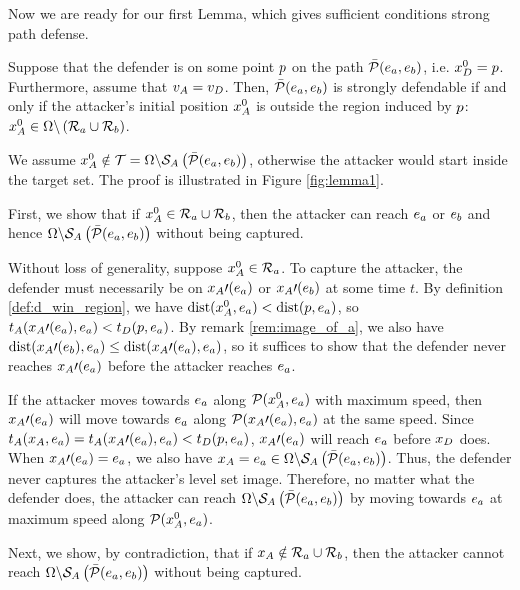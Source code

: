 Now we are ready for our first Lemma, which gives sufficient conditions strong path defense.
\begin{lem}
\label{lem:d_winning_region}
Suppose that the defender is on some point $p$ on the path $\bar{\mathcal{P}}(e_a,e_b)$, i.e. $x_D^0 = p$. Furthermore, assume that $v_A=v_D$. Then, $\bar{\mathcal{P}}(e_a,e_b)$ is strongly defendable if and only if the attacker's initial position $x_A^0$ is outside the region induced by $p$: $x_A^0\in\Omega\backslash\left(\mathcal{R}_a \cup \mathcal{R}_b\right)$.
\end{lem}

\begin{IEEEproof} %
We assume $x_A^0 \notin \mathcal{T} = \Omega\backslash\mathcal{S}_A\left(\bar{\mathcal{P}}(e_a,e_b)\right)$, otherwise the attacker would start inside the target set. The proof is illustrated in Figure \ref{fig:lemma1}.

First, we show that if $x_A^0\in \mathcal{R}_a \cup \mathcal{R}_b$, then the attacker can reach $e_a$ or $e_b$ and hence $\Omega\backslash\mathcal{S}_A\left(\bar{\mathcal{P}}(e_a,e_b)\right)$ without being captured. 

Without loss of generality, suppose $x_A^0\in\mathcal{R}_a$. To capture the attacker, the defender must necessarily be on $x_A\prime(e_a)$ or $x_A\prime(e_b)$ at some time $t$. By definition \ref{def:d_win_region}, we have $\text{dist}(x_A^0,e_a) < \text{dist}(p,e_a)$, so $t_A(x_A\prime(e_a),e_a) < t_D(p,e_a)$. By remark \ref{rem:image_of_a}, we also have $\text{dist}(x_A\prime(e_b),e_a) \le \text{dist}(x_A\prime(e_a),e_a)$, so it suffices to show that the defender never reaches $x_A\prime(e_a)$ before the attacker reaches $e_a$. 

If the attacker moves towards $e_a$ along $\mathcal{P}(x_A^0,e_a)$ with maximum speed, then $x_A\prime(e_a)$ will move towards $e_a$ along $\mathcal{P}(x_A\prime(e_a),e_a)$ at the same speed. Since $t_A(x_A,e_a)=t_A(x_A\prime(e_a),e_a)<t_D(p,e_a)$, $x_A\prime(e_a)$ will reach $e_a$ before $x_D$ does. When $x_A\prime(e_a)=e_a$, we also have $x_A=e_a\in\Omega\backslash\mathcal{S}_A\left(\bar{\mathcal{P}}(e_a,e_b)\right)$. Thus, the defender never captures the attacker's level set image. Therefore, no matter what the defender does, the attacker can reach $\Omega\backslash\mathcal{S}_A\left(\bar{\mathcal{P}}(e_a,e_b)\right)$ by moving towards $e_a$ at maximum speed along $\mathcal{P}(x_A^0,e_a)$.

Next, we show, by contradiction, that if $x_A\notin\mathcal{R}_a \cup \mathcal{R}_b$, then the attacker cannot reach $\Omega\backslash\mathcal{S}_A\left(\bar{\mathcal{P}}(e_a,e_b)\right)$ without being captured. 


\end{IEEEproof}
